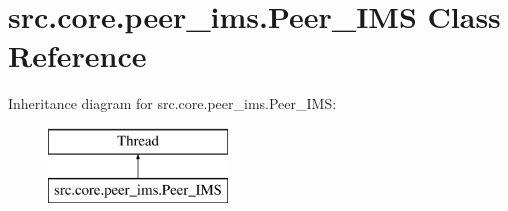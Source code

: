 \hypertarget{classsrc_1_1core_1_1peer__ims_1_1Peer__IMS}{}\section{src.\+core.\+peer\+\_\+ims.\+Peer\+\_\+\+I\+M\+S Class Reference}
\label{classsrc_1_1core_1_1peer__ims_1_1Peer__IMS}
Inheritance diagram for src.\+core.\+peer\+\_\+ims.\+Peer\+\_\+\+I\+M\+S\+:\begin{figure}[H]
\begin{center}
\leavevmode
\includegraphics[height=2.000000cm]{classsrc_1_1core_1_1peer__ims_1_1Peer__IMS}
\end{center}
\end{figure}
